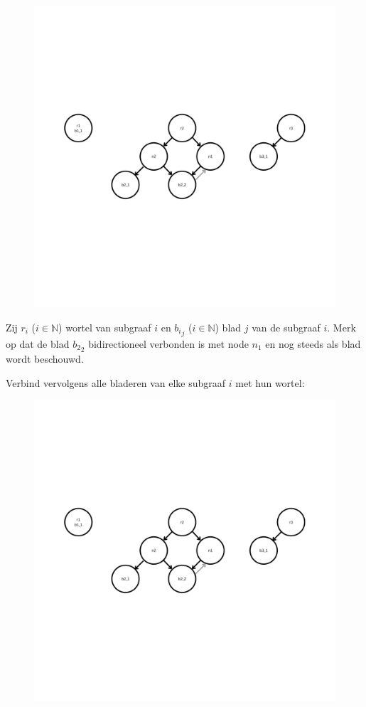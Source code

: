 \documentclass[12pt,a4paper,fleqn]{report}
\begin{document}
	\begin{figure}[htbp]
		\centering
		\includegraphics[page=1, trim=0cm 10.25cm 0cm 10.25cm, clip, width=1.00\textwidth]	{assets/coherent_graph.pdf}
	\end{figure}

	Zij $r_i$ ($i \in \mathbb{N}$) wortel van subgraaf $i$ en ${b_i}_j$ ($i \in \mathbb{N}$)
	blad $j$ van de subgraaf $i$. Merk op dat de blad ${b_2}_2$ bidirectioneel verbonden is
	met node $n_1$ en nog steeds als blad wordt beschouwd.

	Verbind vervolgens alle bladeren van elke subgraaf $i$ met hun wortel:
	\begin{figure}[htbp]
		\centering
		\includegraphics[page=2, trim=0cm 10.25cm 0cm 10.25cm, clip, width=1.00\textwidth]	{assets/coherent_graph.pdf}
	\end{figure}
\end{document}
